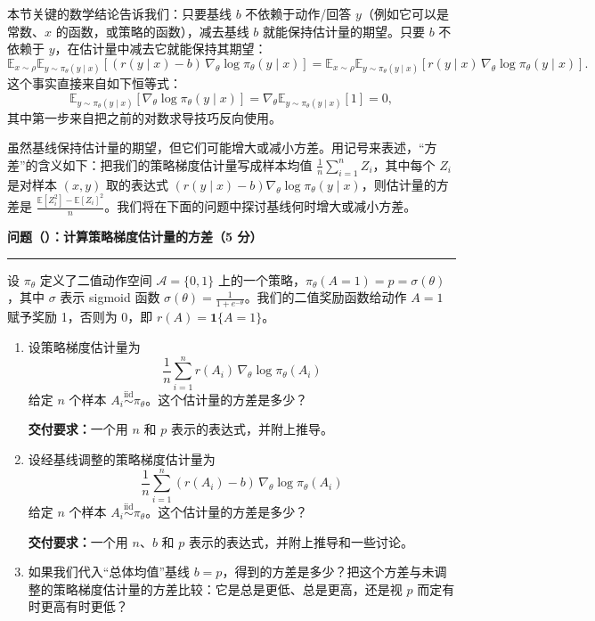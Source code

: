 本节关键的数学结论告诉我们：只要基线 $b$ 不依赖于动作/回答 $y$（例如它可以是常数、$x$ 的函数，或策略的函数），减去基线 $b$ 就能保持估计量的期望。只要 $b$ 不依赖于 $y$，在估计量中减去它就能保持其期望：
\begin{equation}
\mathbb{E}_{x\sim\rho}\mathbb{E}_{y\sim\pi_\theta(y \mid x)}[(r(y \mid x) - b)\, \nabla_\theta \log \pi_\theta(y \mid x)] = \mathbb{E}_{x\sim\rho}\mathbb{E}_{y\sim\pi_\theta(y \mid x)}[r(y \mid x)\, \nabla_\theta \log \pi_\theta(y \mid x)].
\end{equation}
这个事实直接来自如下恒等式：
\begin{equation}
\mathbb{E}_{y\sim\pi_\theta(y \mid x)}[\nabla_\theta \log \pi_\theta(y \mid x)] = \nabla_\theta \mathbb{E}_{y\sim\pi_\theta(y \mid x)}[1] = 0,
\end{equation}
其中第一步来自把之前的对数求导技巧反向使用。

虽然基线保持估计量的期望，但它们可能增大或减小方差。用记号来表述，“方差”的含义如下：把我们的策略梯度估计量写成样本均值 $\frac{1}{n}\sum_{i=1}^{n} Z_i$，其中每个 $Z_i$ 是对样本 $(x, y)$ 取的表达式 $(r(y \mid x) - b)\nabla_\theta \log \pi_\theta(y \mid x)$，则估计量的方差是 $\frac{\mathbb{E}[Z_i^2] - \mathbb{E}[Z_i]^2}{n}$。我们将在下面的问题中探讨基线何时增大或减小方差。

\medskip
\noindent\textbf{问题（）：计算策略梯度估计量的方差（5 分）}
\par\nobreak\smallskip\hrule\nobreak\medskip

设 $\pi_\theta$ 定义了二值动作空间 $\mathcal{A} = \{0, 1\}$ 上的一个策略，$\pi_\theta(A{=}1) = p = \sigma(\theta)$，其中 $\sigma$ 表示 sigmoid 函数 $\sigma(\theta) = \frac{1}{1+e^{-\theta}}$。我们的二值奖励函数给动作 $A = 1$ 赋予奖励 1，否则为 0，即 $r(A) = \mathbf{1}\{A = 1\}$。

\begin{enumerate}[label=(\alph*)]
  \item 设策略梯度估计量为
  \begin{equation}
  \frac{1}{n}\sum_{i=1}^{n} r(A_i)\, \nabla_\theta \log \pi_\theta(A_i)
  \end{equation}
  给定 $n$ 个样本 $A_i \overset{\text{iid}}{\sim} \pi_\theta$。这个估计量的方差是多少？

  \textbf{交付要求：}一个用 $n$ 和 $p$ 表示的表达式，并附上推导。

  \item 设经基线调整的策略梯度估计量为
  \begin{equation}
  \frac{1}{n}\sum_{i=1}^{n} (r(A_i) - b)\, \nabla_\theta \log \pi_\theta(A_i)
  \end{equation}
  给定 $n$ 个样本 $A_i \overset{\text{iid}}{\sim} \pi_\theta$。这个估计量的方差是多少？

  \textbf{交付要求：}一个用 $n$、$b$ 和 $p$ 表示的表达式，并附上推导和一些讨论。

  \item 如果我们代入“总体均值”基线 $b = p$，得到的方差是多少？把这个方差与未调整的策略梯度估计量的方差比较：它是总是更低、总是更高，还是视 $p$ 而定有时更高有时更低？
\end{enumerate}

